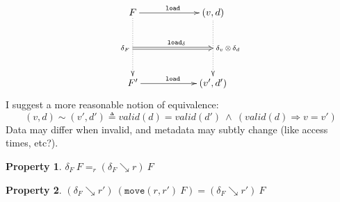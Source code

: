\documentclass[10pt,twoside,a4paper]{article}
\theoremstyle{theorem}
\theoremstyle{lemma}
\theoremstyle{property}
\newtheorem{property}{Property}[section]
\begin{document}
\begin{displaymath}
	\xymatrix@=2cm{
	F\ar@{->}[r]^{\mathtt{load}}
	\ar@{..>}[d]_{\delta_F}="a"
	& (v,d)\ar@{..>}[d]^{\delta_v \,\otimes\, \delta_d}="b"\\
	F' \ar@{->}[r]^{\mathtt{load}}
	& (v',d')
	\ar@{=>}^{\mathtt{load_\delta}}"a";"b"
	}
\end{displaymath}
I suggest a more reasonable notion of equivalence:
\begin{displaymath}
	(v,d) \sim (v',d') \triangleq valid(d)=valid(d') ~\wedge~ (valid(d) \Rightarrow v = v')
\end{displaymath}
Data may differ when invalid, and metadata may subtly change (like access times, etc?).

\begin{property}
	$\delta_F ~ F =_r (\delta_F \searrow r) ~ F$
\label{prop:deltaFUnder1}
\end{property}
\begin{property}
	$(\delta_F \searrow r') ~ (\mathtt{move}(r,r') ~ F) = (\delta_F \searrow r') ~ F$
\label{prop:deltaFUnder2}
\end{property}
\end{document}
